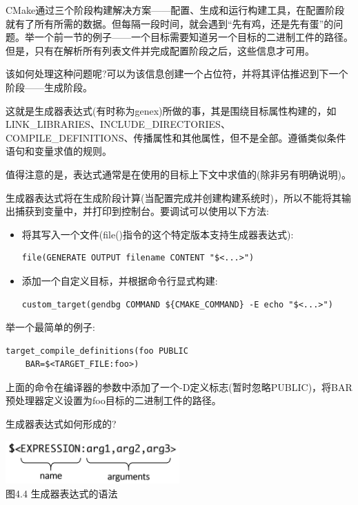 
CMake通过三个阶段构建解决方案——配置、生成和运行构建工具，在配置阶段就有了所有所需的数据。但每隔一段时间，就会遇到“先有鸡，还是先有蛋”的问题。举一个前一节的例子——一个目标需要知道另一个目标的二进制工件的路径。但是，只有在解析所有列表文件并完成配置阶段之后，这些信息才可用。

该如何处理这种问题呢?可以为该信息创建一个占位符，并将其评估推迟到下一个阶段——生成阶段。

这就是生成器表达式(有时称为genex)所做的事，其是围绕目标属性构建的，如LINK\_LIBRARIES、INCLUDE\_DIRECTORIES、COMPILE\_DEFINITIONS、传播属性和其他属性，但不是全部。遵循类似条件语句和变量求值的规则。

值得注意的是，表达式通常是在使用的目标上下文中求值的(除非另有明确说明)。

\begin{tcolorbox}[colback=blue!5!white,colframe=blue!75!black,title=重要的Note]
生成器表达式将在生成阶段计算(当配置完成并创建构建系统时)，所以不能将其输出捕获到变量中，并打印到控制台。要调试可以使用以下方法:

\begin{itemize}
\item 
将其写入一个文件(file()指令的这个特定版本支持生成器表达式):
\begin{lstlisting}[style=styleCMake]
file(GENERATE OUTPUT filename CONTENT "$<...>")
\end{lstlisting}

\item 
添加一个自定义目标，并根据命令行显式构建:
\begin{lstlisting}[style=styleCMake]
custom_target(gendbg COMMAND ${CMAKE_COMMAND} -E echo "$<...>")
\end{lstlisting}
\end{itemize}
\end{tcolorbox}


举一个最简单的例子:

\begin{lstlisting}[style=styleCMake]
target_compile_definitions(foo PUBLIC
	BAR=$<TARGET_FILE:foo>)
\end{lstlisting}

上面的命令在编译器的参数中添加了一个-D定义标志(暂时忽略PUBLIC)，将BAR预处理器定义设置为foo目标的二进制工件的路径。

生成器表达式如何形成的?

\begin{center}
\includegraphics[width=0.5\textwidth]{content/2/chapter4/images/4.jpg}\\
图4.4 生成器表达式的语法
\end{center}

